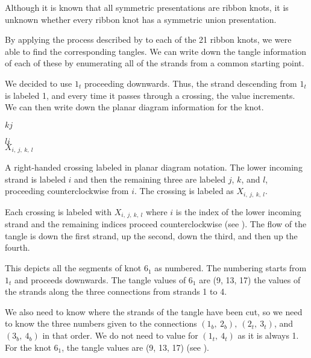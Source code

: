 \begin{paper}
Although it is known that all symmetric presentations are ribbon knots, it is
unknown whether every ribbon knot has a symmetric union presentation.


By applying the process described by \thmRibbon to each of the 21 ribbon knots,
we were able to find the corresponding tangles.
We can write down the tangle information of each of these by enumerating all of
the strands from a common starting point.

We decided to use $1_t$ proceeding downwards.
Thus, the strand descending from $1_t$ is labeled 1, and every time it passes
through a crossing, the value increments.
We can then write down the planar diagram information for the knot.

{\hspace{0.3in}\hspace{0.175\columnwidth}$k$\hspace{0.4\columnwidth}$j$
\begin{center}\end{center}

\hspace{0.3in}\hspace{0.175\columnwidth}$l$\hspace{0.4\columnwidth}$i$\\

\hspace{0.3in}\hspace{0.31\columnwidth}$X_{i,~j,~k,~l}$}
{A right-handed crossing labeled in planar diagram notation.
The lower incoming strand is labeled $i$ and then the remaining three are
labeled $j$, $k$, and $l$, proceeding counterclockwise from $i$.
The crossing is labeled as $X_{i,~j,~k,~l}$.}

Each crossing is labeled with $X_{i,~j,~k,~l}$ where $i$ is the index of the
lower incoming strand and the remaining indices proceed counterclockwise (see
\figCrossing).
The flow of the tangle is down the first strand, up the second, down the third,
and then up the fourth.

{This depicts all the segments of knot $6_1$ as numbered.
The numbering starts from $1_t$ and proceeds downwards.
The tangle values of $6_1$ are (9, 13, 17) the values of the strands along the
three connections from strands 1 to 4.}

We also need to know where the strands of the tangle have been cut, so we need
to know the three numbers given to the connections $(1_b,~2_b),~(2_t,~3_t)$, and
$(3_b,~4_b)$ in that order.
We do not need to value for $(1_t,~4_t)$ as it is always 1.
For the knot $6_1$, the tangle values are (9, 13, 17) (see \figExample).


\end{paper}
